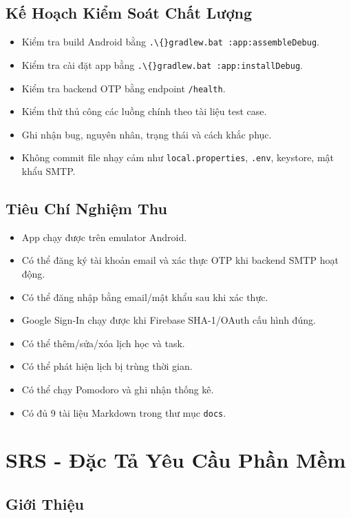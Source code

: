 \documentclass[12pt,a4paper]{report}
\begin{document}
\section{Kế Hoạch Kiểm Soát Chất Lượng}

\begin{itemize}
\item Kiểm tra build Android bằng \texttt{.\textbackslash\{\}gradlew.bat :app:assembleDebug}.
\item Kiểm tra cài đặt app bằng \texttt{.\textbackslash\{\}gradlew.bat :app:installDebug}.
\item Kiểm tra backend OTP bằng endpoint \texttt{/health}.
\item Kiểm thử thủ công các luồng chính theo tài liệu test case.
\item Ghi nhận bug, nguyên nhân, trạng thái và cách khắc phục.
\item Không commit file nhạy cảm như \texttt{local.properties}, \texttt{.env}, keystore, mật khẩu SMTP.
\end{itemize}

\section{Tiêu Chí Nghiệm Thu}

\begin{itemize}
\item App chạy được trên emulator Android.
\item Có thể đăng ký tài khoản email và xác thực OTP khi backend SMTP hoạt động.
\item Có thể đăng nhập bằng email/mật khẩu sau khi xác thực.
\item Google Sign-In chạy được khi Firebase SHA-1/OAuth cấu hình đúng.
\item Có thể thêm/sửa/xóa lịch học và task.
\item Có thể phát hiện lịch bị trùng thời gian.
\item Có thể chạy Pomodoro và ghi nhận thống kê.
\item Có đủ 9 tài liệu Markdown trong thư mục \texttt{docs}.
\end{itemize}
\clearpage
\chapter{SRS - Đặc Tả Yêu Cầu Phần Mềm}

\section{Giới Thiệu}
\end{document}
